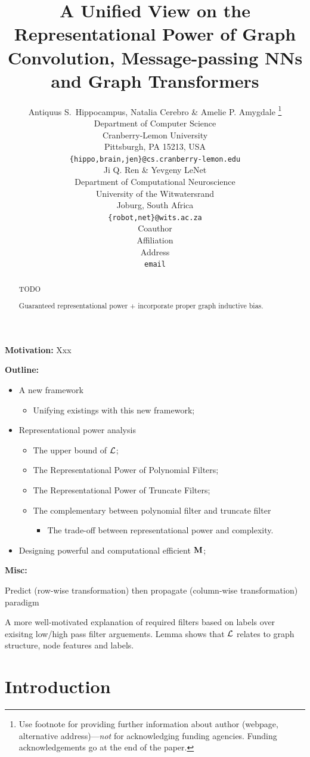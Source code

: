 \documentclass{article} %
\title{A Unified View on the Representational Power of Graph Convolution, Message-passing NNs and Graph Transformers}
\author{Antiquus S.~Hippocampus, Natalia Cerebro \& Amelie P. Amygdale \thanks{ Use footnote for providing further information
		about author (webpage, alternative address)---\emph{not} for acknowledging
		funding agencies.  Funding acknowledgements go at the end of the paper.} \\
	Department of Computer Science\\
	Cranberry-Lemon University\\
	Pittsburgh, PA 15213, USA \\
	\texttt{\{hippo,brain,jen\}@cs.cranberry-lemon.edu} \\
	\And
	Ji Q. Ren \& Yevgeny LeNet \\
	Department of Computational Neuroscience \\
	University of the Witwatersrand \\
	Joburg, South Africa \\
	\texttt{\{robot,net\}@wits.ac.za} \\
	\AND
	Coauthor \\
	Affiliation \\
	Address \\
	\texttt{email}
}
\begin{document}
	
	\maketitle
	
	\begin{abstract}
		TODO
		
		Guaranteed representational power + incorporate proper graph inductive bias.
	\end{abstract}
	
	{\color{orange}
		\textbf{Motivation:}
		Xxx
	}
	
	{\color{blue}
		\textbf{Outline:}
		\begin{itemize}
			\item
			A new framework
			\begin{itemize}
				\item
				Unifying existings with this new framework;
			\end{itemize}
			\item
			Representational power analysis
			\begin{itemize}
				\item
				The upper bound of ${\mathcal{L}}$;
				\item
				The Representational Power of Polynomial Filters;
				\item
				The Representational Power of Truncate Filters;
				\item
				The complementary between polynomial filter and truncate filter
				\begin{itemize}
					\item
					The trade-off between representational power and complexity.
				\end{itemize}
			\end{itemize}
			\item
			Designing powerful and computational efficient ${\mathbf{M}}$;
		\end{itemize}
	}
	
	{\color{purple}
		\textbf{Misc:}
		
		Predict (row-wise transformation) then propagate (column-wise transformation) paradigm
		
		A more well-motivated explanation of required filters based on labels over exisitng low/high pass filter arguements.
		Lemma shows that ${\mathcal{L}}$ relates to graph structure, node features and labels.
	}
	
	\section{Introduction}
	
\end{document}
